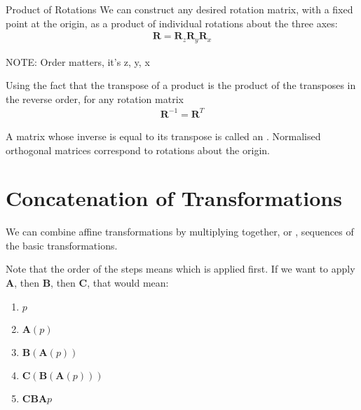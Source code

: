 \documentclass[../COS3712_Notes.tex]{subfiles}
\begin{document}
        \begin{sidenote}{Product of Rotations}
          We can construct any desired rotation matrix, with a fixed point at the origin,
          as a product of individual rotations about the three axes:
          \begin{align*}
            \mathbf{R} = \mathbf{R}_z\mathbf{R}_y\mathbf{R}_x
          \end{align*}

          NOTE: Order matters, it's z, y, x
        \end{sidenote}

        Using the fact that the transpose of a product is the product of the transposes
        in the reverse order, for any rotation matrix
        \begin{align*}
          \mathbf{R}^{-1} = \mathbf{R}^T
        \end{align*}

        A matrix whose inverse is equal to its transpose is called an .
        Normalised orthogonal matrices correspond to rotations about the origin.

    \section{Concatenation of Transformations}
      We can combine affine transformations by multiplying together, or ,
      sequences of the basic transformations.

      Note that the order of the steps means which is applied first.
      If we want to apply $\mathbf{A}$, then $\mathbf{B}$, then $\mathbf{C}$,
      that would mean:
      \begin{enumerate}[nosep]
        \item $p$
        \item $\mathbf{A}(p)$
        \item $\mathbf{B}(\mathbf{A}(p))$
        \item $\mathbf{C}(\mathbf{B}(\mathbf{A}(p)))$
        \item $\mathbf{CBA}p$
      \end{enumerate}
\end{document}
